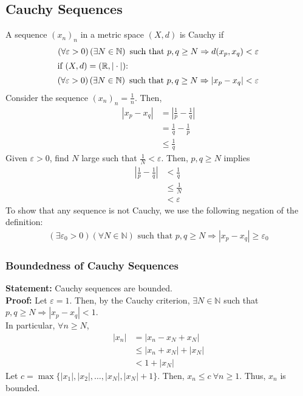 \documentclass[10pt]{extarticle}
\newcommand{\N}{\mathbb{N}}
\newcommand{\R}{\mathbb{R}}
\begin{document}
  \subsection{Cauchy Sequences}%
    A sequence $(x_n)_n$ in a metric space $(X,d)$ is Cauchy if 
    \begin{align*}
      \left(\forall \varepsilon > 0\right)\left(\exists N\in\N\right) \text{ such that } p,q\geq N \Rightarrow d(x_p,x_q) < \varepsilon\\
      \shortintertext{if $(X,d) = (\R,|\cdot|)$:}
      \left(\forall \varepsilon > 0\right)\left(\exists N\in\N\right) \text{ such that } p,q\geq N \Rightarrow |x_p-x_q| < \varepsilon
    \end{align*}
    Consider the sequence $(x_n)_n = \frac{1}{n}$. Then,
    \begin{align*}
      |x_p - x_q| &= \left|\frac{1}{p}-\frac{1}{q}\right|\\
                  &= \frac{1}{q}-\frac{1}{p}\\
                  &\leq \frac{1}{q}
    \end{align*}
    Given $\varepsilon > 0$, find $N$ large such that $\frac{1}{N}< \varepsilon$. Then, $p,q\geq N$ implies
    \begin{align*}
      \left|\frac{1}{p}-\frac{1}{q}\right|& < \frac{1}{q}\\
                                          &\leq \frac{1}{N}\\
                                          &< \varepsilon
    \end{align*}
    To show that any sequence is not Cauchy, we use the following negation of the definition:
    \begin{align*}
      \left(\exists \varepsilon_0 > 0\right)\left(\forall N\in\N\right) \text{ such that } p,q\geq N \Rightarrow |x_p - x_q| \geq \varepsilon_0
    \end{align*}
    \subsubsection{Boundedness of Cauchy Sequences}%
    \textbf{Statement:} Cauchy sequences are bounded.\\

    \textbf{Proof:} Let $\varepsilon = 1$. Then, by the Cauchy criterion, $\exists N\in\N$ such that $p,q\geq N \Rightarrow |x_p-x_q| < 1$.\\

      In particular, $\forall n\geq N$,
      \begin{align*}
        |x_n| &= |x_n - x_N + x_N|\\
              &\leq |x_n + x_N| + |x_N| \tag*{Triangle Inequality}\\
              &< 1 + |x_N|
      \end{align*}
      Let $c = \max\{|x_1|,|x_2|,\dots,|x_N|,|x_N|+1\}$. Then, $x_n \leq c~\forall n\geq 1$. Thus, $x_n$ is bounded.
\end{document}
